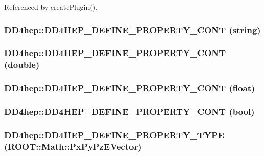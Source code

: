 Referenced by createPlugin().\hypertarget{namespace_d_d4hep_ab33d2c119234589fde3ac44efa5d2fbc}{
\subsubsection[{DD4HEP\_\-DEFINE\_\-PROPERTY\_\-CONT}]{\setlength{\rightskip}{0pt plus 5cm}DD4hep::DD4HEP\_\-DEFINE\_\-PROPERTY\_\-CONT ({\bf string})}}
\label{namespace_d_d4hep_ab33d2c119234589fde3ac44efa5d2fbc}
\hypertarget{namespace_d_d4hep_ad408fcdf0daa5ec52a5a1dbfbf211eb4}{
\subsubsection[{DD4HEP\_\-DEFINE\_\-PROPERTY\_\-CONT}]{\setlength{\rightskip}{0pt plus 5cm}DD4hep::DD4HEP\_\-DEFINE\_\-PROPERTY\_\-CONT (double)}}
\label{namespace_d_d4hep_ad408fcdf0daa5ec52a5a1dbfbf211eb4}
\hypertarget{namespace_d_d4hep_ae9ef794f55e34dba969074941408b572}{
\subsubsection[{DD4HEP\_\-DEFINE\_\-PROPERTY\_\-CONT}]{\setlength{\rightskip}{0pt plus 5cm}DD4hep::DD4HEP\_\-DEFINE\_\-PROPERTY\_\-CONT (float)}}
\label{namespace_d_d4hep_ae9ef794f55e34dba969074941408b572}
\hypertarget{namespace_d_d4hep_a2a12fc15eee252853c7dae0c8c10289c}{
\subsubsection[{DD4HEP\_\-DEFINE\_\-PROPERTY\_\-CONT}]{\setlength{\rightskip}{0pt plus 5cm}DD4hep::DD4HEP\_\-DEFINE\_\-PROPERTY\_\-CONT (bool)}}
\label{namespace_d_d4hep_a2a12fc15eee252853c7dae0c8c10289c}
\hypertarget{namespace_d_d4hep_a8b032fe993ba835daea31abfe2fa1d19}{
\subsubsection[{DD4HEP\_\-DEFINE\_\-PROPERTY\_\-TYPE}]{\setlength{\rightskip}{0pt plus 5cm}DD4hep::DD4HEP\_\-DEFINE\_\-PROPERTY\_\-TYPE (ROOT::Math::PxPyPzEVector)}}
